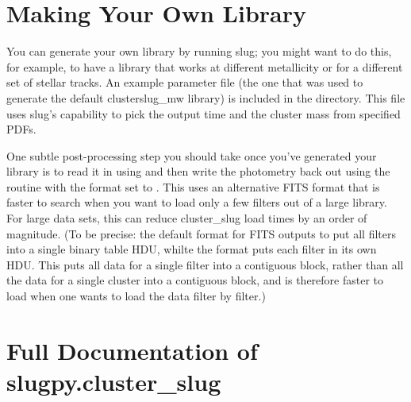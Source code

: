 \documentclass[letterpaper,10pt,english]{sphinxmanual}
\begin{document}
\section{Making Your Own Library}
\label{cluster_slug:making-your-own-library}
You can generate your own library by running slug; you might want to do this, for example, to have a library that works at different metallicity or for a different set of stellar tracks. An example parameter file (the one that was used to generate the default clusterslug\_mw library) is included in the  directory. This file uses slug's capability to pick the output time and the cluster mass from specified PDFs.

One subtle post-processing step you should take once you've generated your library is to read it in using {\hyperref[slugpy:sec-slugpy]{\emph{}}} and then write the photometry back out using the  routine with the format set to . This uses an alternative FITS format that is faster to search when you want to load only a few filters out of a large library. For large data sets, this can reduce cluster\_slug load times by an order of magnitude. (To be precise: the default format for FITS outputs to put all filters into a single binary table HDU, whilte the  format puts each filter in its own HDU. This puts all data for a single filter into a contiguous block, rather than all the data for a single cluster into a contiguous block, and is therefore faster to load when one wants to load the data filter by filter.)


\section{Full Documentation of slugpy.cluster\_slug}
\label{cluster_slug:ssec-cluster-slug-full}\label{cluster_slug:full-documentation-of-slugpy-cluster-slug}
\end{document}
